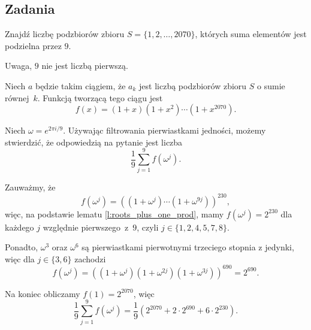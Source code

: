 \documentclass{scrartcl}
\begin{document}
    \subsection{Zadania}
    \begin{problem}
        Znajdź liczbę podzbiorów zbioru $S = \{1,2,\ldots,2070\}$, których suma elementów jest podzielna przez $9$.
        \begin{hint}
            Uwaga, $9$ nie jest liczbą pierwszą.
        \end{hint}
        \begin{answer}
            Niech $a$ będzie takim ciągiem, że $a_k$ jest liczbą podzbiorów zbioru $S$ o sumie równej~$k$. Funkcją tworzącą tego ciągu jest
            $$ f(x) = (1 + x)(1 + x^2)\cdots(1 + x^{2070}). $$

            Niech $\omega = e^{2\pi i/9}$. Używając filtrowania pierwiastkami jedności, możemy stwierdzić, że odpowiedzią na pytanie jest liczba
            $$ \frac{1}{9}\sum_{j = 1}^9 f(\omega^j). $$

            Zauważmy, że
            $$ f(\omega^j) = \left((1 + \omega^j)\cdots(1 + \omega^{9j})\right)^{230}, $$
            więc, na podstawie lematu \ref{l:roots_plus_one_prod}, mamy $f(\omega^j) = 2^{230}$ dla każdego $j$ względnie pierwszego~z~$9$, czyli $j\in\{1,2,4,5,7,8\}$.

            Ponadto, $\omega^3$ oraz $\omega^6$ są pierwiastkami pierwotnymi trzeciego stopnia z jedynki, więc dla $j\in\{3,6\}$ zachodzi
            $$ f(\omega^j) = \left((1 + \omega^j)(1 + \omega^{2j})(1 + \omega^{3j})\right)^{690} = 2^{690}. $$

            Na koniec obliczamy $f(1) = 2^{2070}$, więc
            $$ \frac{1}{9}\sum_{j = 1}^9 f(\omega^j) = \frac{1}{9}\left(2^{2070} + 2\cdot 2^{690} + 6\cdot 2^{230}\right). $$
        \end{answer}
    \end{problem}
\end{document}
